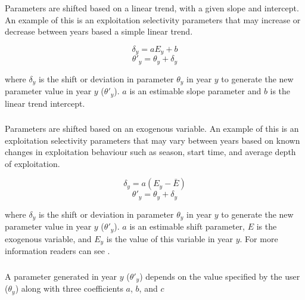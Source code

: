 Parameters are shifted based on a linear trend, with a given slope and intercept. An example of this is an exploitation selectivity parameters that may increase or decrease between years based a simple linear trend.

\begin{equation}
	\delta_y = a E_y + b
\end{equation}
\begin{equation}
	\theta'_y = \theta_y + \delta_y
\end{equation}

where $\delta_y$ is the shift or deviation in parameter $\theta_y$ in year $y$ to generate the new parameter value in year $y$ ($\theta'_y$). $a$ is an estimable slope parameter and $b$ is the linear trend intercept.

\subsubsection[Exogenous]{}\label{sec:TimeVarying-Exogenous}

Parameters are shifted based on an exogenous variable. An example of this is an exploitation selectivity parameters that may vary between years based on known changes in exploitation behaviour such as season, start time, and average depth of exploitation.

\begin{equation}
	\delta_y = a(E_y - \bar{E})
\end{equation}
\begin{equation}
	\theta'_y = \theta_y + \delta_y
\end{equation}

where $\delta_y$ is the shift or deviation in parameter $\theta_y$ in year $y$ to generate the new parameter value in year $y$ ($\theta'_y$). $a$ is an estimable shift parameter, $E$ is the exogenous variable, and $E_y$ is the value of this variable in year $y$. For more information readers can see \cite{francis_03}.

\subsubsection[Annual shift]{} \label{sec:TimeVarying-AnnualShift}

A parameter generated in year $y$ ($\theta'_y$) depends on the value specified by the user ($\theta_y$) along with three coefficients $a$, $b$, and $c$

